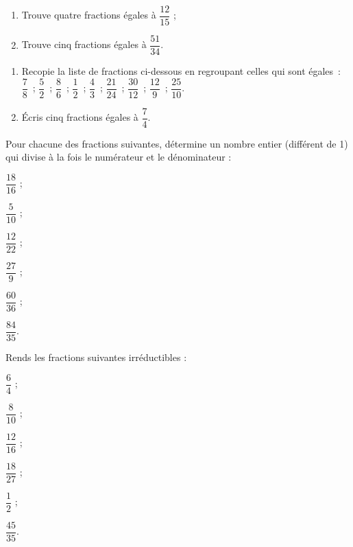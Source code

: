 \begin{exercice}
\begin{enumerate}
 \item Trouve quatre fractions égales à $\dfrac{12}{15}$ ;
 \item Trouve cinq fractions égales à $\dfrac{51}{34}$.
 \end{enumerate}
\end{exercice}


\begin{exercice}
\begin{enumerate}
 \item Recopie la liste de fractions ci-dessous en regroupant celles qui sont égales : \\[0.5em]
$\dfrac{7}{8}$ ; $\dfrac{5}{2}$ ; $\dfrac{8}{6}$ ; $\dfrac{1}{2}$ ; $\dfrac{4}{3}$ ; $\dfrac{21}{24}$ ; $\dfrac{30}{12}$ ; $\dfrac{12}{9}$ ; $\dfrac{25}{10}$.
\vspace{0.2cm}
 \item Écris cinq fractions égales à $\dfrac{7}{4}$.
 \end{enumerate}
\end{exercice}


\begin{exercice}
Pour chacune des fractions suivantes, détermine un nombre entier (différent de 1) qui divise à la fois le numérateur et le dénominateur :
\vspace{0.5cm}
\begin{colenumerate}{3}
 \item $\dfrac{18}{16}$ ; 
 \vspace{0.2cm}
 \item $\dfrac{5}{10}$ ; 
 \item $\dfrac{12}{22}$ ; 
 \item $\dfrac{27}{9}$ ; 
 \item $\dfrac{60}{36}$ ; 
 \item $\dfrac{84}{35}$.
 \end{colenumerate}
\end{exercice}


\begin{exercice}
Rends les fractions suivantes irréductibles :
\vspace{0.5cm}
\begin{colenumerate}{3}
 \item $\dfrac{6}{4}$ ; 
 \vspace{0.2cm}
 \item $\dfrac{8}{10}$ ; 
 \item $\dfrac{12}{16}$ ; 
 \item $\dfrac{18}{27}$ ; 
 \item $\dfrac{1}{2}$ ; 
 \item $\dfrac{45}{35}$.
 \end{colenumerate}
 \end{exercice}


